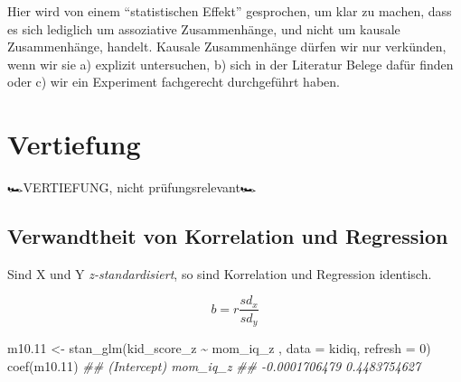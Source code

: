 \documentclass[
  a4paper,
  DIV=11]{scrreprt}
\newenvironment{Shaded}{\begin{snugshade}}{\end{snugshade}}
\newcommand{\AttributeTok}[1]{\textcolor[rgb]{0.40,0.45,0.13}{#1}}
\newcommand{\DecValTok}[1]{\textcolor[rgb]{0.68,0.00,0.00}{#1}}
\newcommand{\DocumentationTok}[1]{\textcolor[rgb]{0.37,0.37,0.37}{\textit{#1}}}
\newcommand{\FloatTok}[1]{\textcolor[rgb]{0.68,0.00,0.00}{#1}}
\newcommand{\FunctionTok}[1]{\textcolor[rgb]{0.28,0.35,0.67}{#1}}
\newcommand{\NormalTok}[1]{\textcolor[rgb]{0.00,0.23,0.31}{#1}}
\newcommand{\OtherTok}[1]{\textcolor[rgb]{0.00,0.23,0.31}{#1}}
\newcommand{\SpecialCharTok}[1]{\textcolor[rgb]{0.37,0.37,0.37}{#1}}
\theoremstyle{definition}
\theoremstyle{remark}
\begin{document}
\begin{tcolorbox}[enhanced jigsaw, left=2mm, colframe=quarto-callout-important-color-frame, opacityback=0, arc=.35mm, rightrule=.15mm, breakable, toptitle=1mm, colbacktitle=quarto-callout-important-color!10!white, colback=white, coltitle=black, bottomrule=.15mm, titlerule=0mm, opacitybacktitle=0.6, bottomtitle=1mm, title=\textcolor{quarto-callout-important-color}{\faExclamation}\hspace{0.5em}{Wichtig}, toprule=.15mm, leftrule=.75mm]
Hier wird von einem ``statistischen Effekt'' gesprochen, um klar zu
machen, dass es sich lediglich um assoziative Zusammenhänge, und nicht
um kausale Zusammenhänge, handelt. Kausale Zusammenhänge dürfen wir nur
verkünden, wenn wir sie a) explizit untersuchen, b) sich in der
Literatur Belege dafür finden oder c) wir ein Experiment fachgerecht
durchgeführt haben.
\end{tcolorbox}

\hypertarget{vertiefung-2}{%
\section{Vertiefung}\label{vertiefung-2}}

🏎️VERTIEFUNG, nicht prüfungsrelevant🏎️

\hypertarget{verwandtheit-von-korrelation-und-regression}{%
\subsection{Verwandtheit von Korrelation und
Regression}\label{verwandtheit-von-korrelation-und-regression}}

Sind X und Y \emph{z-standardisiert}, so sind Korrelation und Regression
identisch.

\[b = r \frac{sd_x}{sd_y}\]

\begin{Shaded}
\begin{Highlighting}[]
\NormalTok{m10}\FloatTok{.11} \OtherTok{\textless{}{-}} 
  \FunctionTok{stan\_glm}\NormalTok{(kid\_score\_z }\SpecialCharTok{\textasciitilde{}}\NormalTok{ mom\_iq\_z , }\AttributeTok{data =}\NormalTok{ kidiq, }\AttributeTok{refresh =} \DecValTok{0}\NormalTok{)}
\FunctionTok{coef}\NormalTok{(m10}\FloatTok{.11}\NormalTok{)}
\DocumentationTok{\#\#   (Intercept)      mom\_iq\_z }
\DocumentationTok{\#\# {-}0.0001706479  0.4483754627}
\end{Highlighting}
\end{Shaded}
\end{document}
